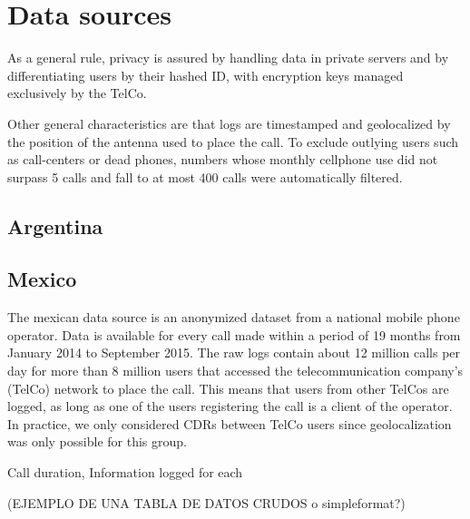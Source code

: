 \section{Data sources}

As a general rule, privacy is assured by handling data in private servers and by differentiating users by their hashed ID, with encryption keys managed exclusively by the TelCo.

Other general characteristics are that logs are timestamped and geolocalized by the position of the antenna used to place the call. To exclude outlying users such as call-centers or dead phones, numbers whose monthly cellphone use did not surpass 5 calls and fall to at most 400 calls were automatically filtered.

\subsection{Argentina}

\subsection{Mexico}

The mexican data source is an anonymized dataset from a national mobile phone operator. Data is available for every call made within a period of 19 months from January 2014 to September 2015. The raw logs contain about 12 million calls per day for more than 8 million users that accessed the telecommunication company's (TelCo) network to place the call. This means that users from other TelCos are logged, as long as one of the users registering the call is a client of the operator. In practice, we only considered CDRs between TelCo users since geolocalization was only possible for this group.

Call duration, Information logged for each

(EJEMPLO DE UNA TABLA DE DATOS CRUDOS o simpleformat?)



